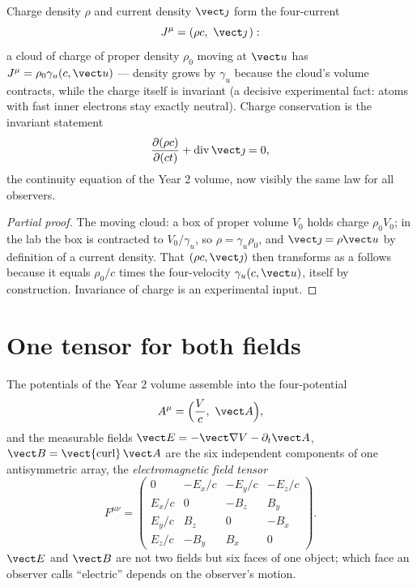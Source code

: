\begin{proposition}\label{prop:b3:covariant-electromagnetism:fourcurrent}
Charge density $\rho$ and current density $\vect\jmath$ form the
four-current
\[
J^\mu = (\rho c,\ \vect\jmath\,) :
\]
a cloud of charge of proper density $\rho_0$ moving at $\vect u$ has
$J^\mu = \rho_0\gamma_u(c, \vect u)$ --- density grows by $\gamma_u$
because the cloud's volume contracts, while the charge itself is
invariant (a decisive experimental fact: atoms with fast inner
electrons stay exactly neutral). Charge conservation is the
invariant statement
\[
\frac{\partial(\rho c)}{\partial(ct)} +
\operatorname{div}\vect\jmath = 0 ,
\]
the continuity equation of the Year 2 volume, now visibly the same
law for all observers.
\end{proposition}

\begin{proof}[Partial proof]
The moving cloud: a box of proper volume $V_0$ holds charge $\rho_0
V_0$; in the lab the box is contracted to $V_0/\gamma_u$, so $\rho =
\gamma_u\rho_0$, and $\vect\jmath = \rho\vect u$ by definition of a
current density. That $(\rho c, \vect\jmath)$ then transforms as a
 follows because it equals $\rho_0/c$ times the
four-velocity $\gamma_u(c, \vect u)$, itself  by
construction. Invariance of charge is an experimental input.
\end{proof}

\section{One tensor for both fields}

\begin{definition}\label{def:b3:covariant-electromagnetism:tensor}
The potentials of the Year 2 volume assemble into the four-potential
\[
A^\mu = \Big(\frac{V}{c},\ \vect A\Big) ,
\]
and the measurable fields $\vect E = -\vect\nabla V -
\partial_t\vect A$, $\vect B = \operatorname{\vect{curl}}\vect A$ are
the six independent components of one antisymmetric array, the
\emph{electromagnetic field tensor}
\[
F^{\mu\nu} =
\begin{pmatrix}
0 & -E_x/c & -E_y/c & -E_z/c\\
E_x/c & 0 & -B_z & B_y\\
E_y/c & B_z & 0 & -B_x\\
E_z/c & -B_y & B_x & 0
\end{pmatrix} .
\]
$\vect E$ and $\vect B$ are not two fields but six faces of one
object; which face an observer calls ``electric'' depends on the
observer's motion.
\end{definition}

